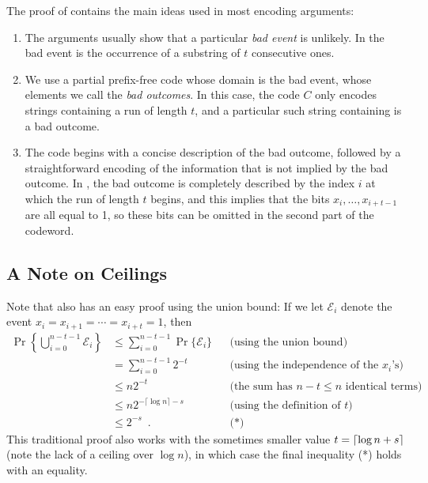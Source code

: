 \documentclass[format=acmsmall, review=false, screen=true]{acmart}
\begin{document}
The proof of  contains the main ideas
used in most encoding arguments: 
\begin{enumerate}
\item The arguments usually show that a particular \emph{bad event} is
  unlikely. In  the bad event is the occurrence of a
  substring of $t$ consecutive ones.

\item We use a partial prefix-free code whose domain is the bad
  event, whose elements we call the \emph{bad outcomes}. In this case, the code
  $C$ only encodes strings containing a run of length $t$,
  and a particular such string containing is a
  bad outcome.

\item The code begins with a concise description of the bad
  outcome, followed by a straightforward encoding of the
  information that is not implied by the bad outcome. In
  , the bad outcome is completely described by the index
  $i$ at which the run of length $t$ begins, and this implies that
  the bits $x_i,\ldots,x_{i+t-1}$ are all equal to 1, so these bits 
  can be omitted in the second part of the codeword.
\end{enumerate}

\subsection{A Note on Ceilings}

Note that  also has an easy proof using the union
bound: If we let $\mathcal{E}_i$ denote the event
$x_i=x_{i+1}=\cdots=x_{i+t}=1$, then
\begin{align*}
  \Pr \left\{\bigcup_{i=0}^{n-t-1} \mathcal{E}_i\right\}
  & \le \sum_{i=0}^{n-t-1} \Pr \{\mathcal{E}_i\} && \text{(using the union bound)}\\
  & = \sum_{i=0}^{n-t-1} 2^{-t}  &&\text{(using the independence of the $x_i$'s)}\\
  & \le n2^{-t} && \text{(the sum has $n-t\le n$ identical terms)}\\
  & \le n2^{-\lceil\log n\rceil-s}&& \text{(using the definition of $t$)}\\
  & \le 2^{-s} \enspace. && \text{(*)}
\end{align*}
This traditional proof also works with the sometimes smaller value
$t={\lceil \log n+s \rceil}$ (note the lack of a ceiling over $\log n$), 
in which case the final inequality (*) holds with an equality.
\end{document}
